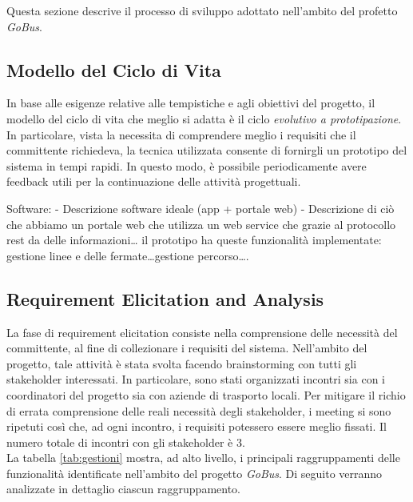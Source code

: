 Questa sezione descrive il processo di sviluppo adottato nell'ambito del profetto \emph{GoBus}.

\subsection{Modello del Ciclo di Vita}
In base alle esigenze relative alle tempistiche e agli obiettivi del progetto, il modello del ciclo di vita che meglio si adatta \`{e} il ciclo \emph{evolutivo a prototipazione}. In particolare, vista la necessita di comprendere meglio i requisiti che il committente richiedeva, la tecnica utilizzata consente di fornirgli un prototipo del sistema in tempi rapidi. In questo modo, \`{e} possibile periodicamente avere feedback utili per la continuazione delle attivit\`{a} progettuali.


Software: - Descrizione software ideale (app + portale web) - Descrizione di ciò che abbiamo un portale web che utilizza un web service che grazie al protocollo rest da delle informazioni… il prototipo ha queste funzionalità implementate: gestione linee e delle fermate…gestione percorso….

\subsection{Requirement Elicitation and Analysis}
La fase di requirement elicitation consiste nella comprensione delle necessit\`{a} del committente, al fine di collezionare i requisiti del sistema. Nell'ambito del progetto, tale attivit\`{a} \`{e} stata svolta facendo brainstorming con tutti gli stakeholder interessati. In particolare, sono stati organizzati incontri sia con i coordinatori del progetto sia con aziende di trasporto locali. Per mitigare il richio di errata comprensione delle reali necessit\`{a} degli stakeholder, i meeting si sono ripetuti così che, ad ogni incontro, i requisiti potessero essere meglio fissati. Il numero totale di incontri con gli stakeholder \`{e} 3.\\
La tabella \ref{tab:gestioni} mostra, ad alto livello, i principali raggruppamenti delle funzionalità identificate nell'ambito del progetto \emph{GoBus}. Di seguito verranno analizzate in dettaglio ciascun raggruppamento.\\

